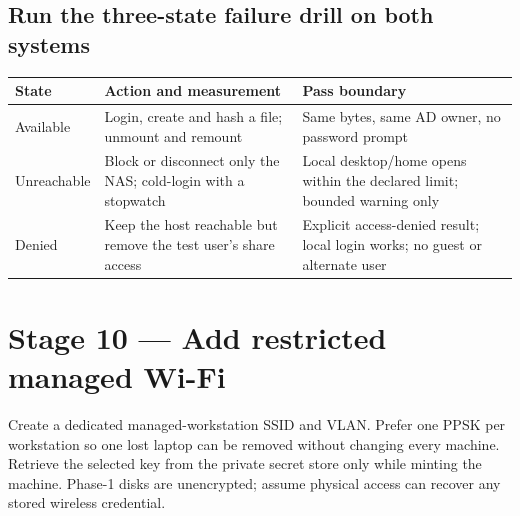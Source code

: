 
\subsection*{Run the three-state failure drill on both systems}

\begin{tabularx}{\linewidth}{@{}p{.17\linewidth}p{.31\linewidth}L@{}}
\toprule
\textbf{State} & \textbf{Action and measurement} & \textbf{Pass boundary}\\
\midrule
Available & Login, create and hash a file; unmount and remount & Same bytes,
same AD owner, no password prompt\\
Unreachable & Block or disconnect only the NAS; cold-login with a stopwatch &
Local desktop/home opens within the declared limit; bounded warning only\\
Denied & Keep the host reachable but remove the test user's share access &
Explicit access-denied result; local login works; no guest or alternate user\\
\bottomrule
\end{tabularx}



\section{Stage 10 --- Add restricted managed Wi-Fi}

Create a dedicated managed-workstation SSID and VLAN. Prefer one PPSK per
workstation so one lost laptop can be removed without changing every machine.
Retrieve the selected key from the private secret store only while minting the
machine. Phase-1 disks are unencrypted; assume physical access can recover any
stored wireless credential.

